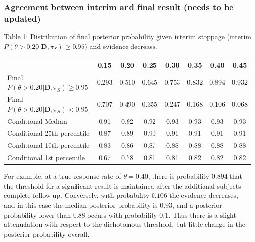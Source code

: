 \documentclass[12pt]{article}
\begin{document}
\subsubsection{Agreement between interim and final result (needs to be updated)}
\begin{center}
Table 1: Distribution of final posterior probability given interim stoppage (interim $P(\theta>0.20|\mathbf{D},\pi_S)\geq 0.95$) and evidence decrease.
\begin{tabular}{l|ccccccc}
&0.15&0.20&0.25&0.30&0.35&0.40&0.45\\
\hline
Final $P(\theta>0.20|\mathbf{D},\pi_S)\geq 0.95$ &0.293&0.510&0.645&0.753&0.832&0.894&0.932 \\ 
Final $P(\theta>0.20|\mathbf{D},\pi_S)< 0.95$&0.707&0.490&0.355&0.247&0.168&0.106&0.068\\  
\hspace{0.5in}Conditional Median&0.91&0.92&0.92&0.93&0.93&0.93&0.93\\  
\hspace{0.5in}Conditional 25th percentile&0.87&0.89&0.90&0.91&0.91&0.91&0.91\\  
\hspace{0.5in}Conditional 10th percentile&0.83&0.86&0.87&0.88&0.88&0.88&0.88\\  
\hspace{0.5in}Conditional 1st percentile&0.67&0.78&0.81&0.81&0.82&0.82&0.82
\end{tabular}
\end{center}

For example, at a true response rate of $\theta=0.40$, there is probability $0.894$ that the threshold for a significant result is maintained after the additional subjects complete follow-up. Conversely, with probability $0.106$ the evidence decreases, and in this case the median posterior probability is $0.93$, and a posterior probability lower than $0.88$ occurs with probability $0.1$. Thus there is a slight attenudation with respect to the dichotomous threshold, but little change in the posterior probability overall.

\end{document}
